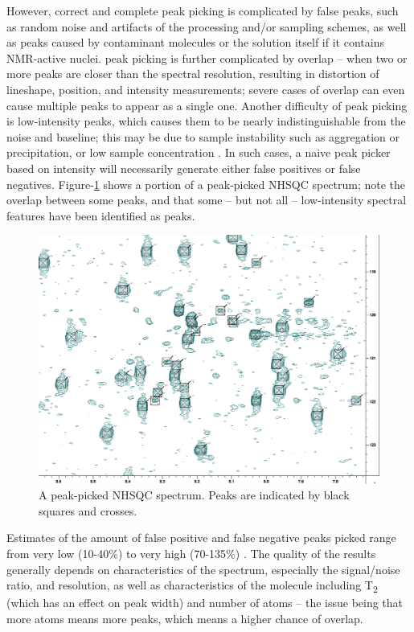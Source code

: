 However, correct and complete peak picking is complicated by false peaks, 
such as random noise and artifacts of the processing and/or sampling schemes, 
as well as peaks caused by contaminant molecules or the solution itself if it 
contains NMR-active nuclei.  peak picking is further complicated by overlap -- 
when two or more peaks are closer than the spectral resolution, resulting in 
distortion of lineshape, position, and intensity measurements; severe cases 
of overlap can even cause multiple peaks to appear as a single one.  Another 
difficulty of peak picking is low-intensity peaks, which causes them to be 
nearly indistinguishable from the noise and baseline; this may be due to 
sample instability such as aggregation or precipitation, or low sample 
concentration
\cite{picky, munin, korzhnev2001munin, apart,
autopsy, pine}
\cite{williamson2009automated, guntert2009automated, altieri2004automation,
baran2004automated}.
In such cases, a naive peak picker based on intensity will necessarily 
generate either false positives or false negatives.
Figure-\ref{nhsqc_peaks} shows a portion of a peak-picked
NHSQC spectrum; note the overlap between some peaks, and that some -- but not
all -- low-intensity spectral features have been identified as peaks.
\begin{figure}
  \includegraphics[scale=0.35]{figures/nhsqc_peaks}
  \caption[A peak-picked NHSQC spectrum]
          {A peak-picked NHSQC spectrum. 
           Peaks are indicated by black squares and crosses.}
  \label{nhsqc_peaks}
\end{figure}

Estimates of the amount of false positive and false negative peaks picked 
range from very low (10-40\%) to very high (70-135\%) \cite{pine}. 
The quality of the results generally depends on characteristics of the 
spectrum, especially the signal/noise ratio, and resolution, as well as 
characteristics of the molecule including T\textsubscript{2} (which has an effect on peak 
width) and number of atoms -- the issue being that more atoms means more 
peaks, which means a higher chance of overlap.

